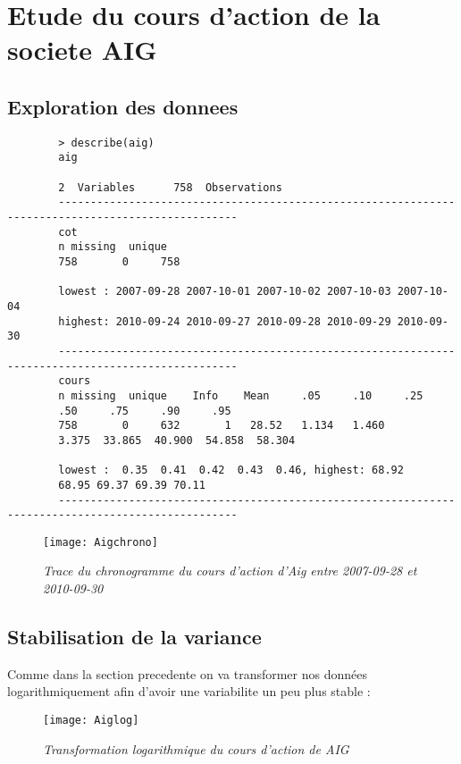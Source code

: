 \section{Etude du cours d'action de la societe AIG}
    \subsection{Exploration des donnees}
        \begin{verbatim}
        > describe(aig)
        aig 

        2  Variables      758  Observations
        --------------------------------------------------------------------------------------------------
        cot 
        n missing  unique 
        758       0     758 

        lowest : 2007-09-28 2007-10-01 2007-10-02 2007-10-03 2007-10-04
        highest: 2010-09-24 2010-09-27 2010-09-28 2010-09-29 2010-09-30 
        --------------------------------------------------------------------------------------------------
        cours 
        n missing  unique    Info    Mean     .05     .10     .25
        .50     .75     .90     .95 
        758       0     632       1   28.52   1.134   1.460
        3.375  33.865  40.900  54.858  58.304 

        lowest :  0.35  0.41  0.42  0.43  0.46, highest: 68.92
        68.95 69.37 69.39 70.11 
        --------------------------------------------------------------------------------------------------
        \end{verbatim}
        \begin{figure}[H]
            \centering 
            \label{fig:Aigchrono} 
            \texttt{[image: Aigchrono]} 
            \caption{\it Trace du chronogramme du cours d'action d'Aig entre
            2007-09-28 et 2010-09-30} 
        \end{figure} 

    \subsection{Stabilisation de la variance}                

        Comme dans la section precedente on va transformer nos données
        logarithmiquement afin d'avoir une variabilite un peu plus
        stable :
        \begin{figure}[H]
            \centering 
            \label{fig:Aiglog} 
            \texttt{[image: Aiglog]} 
            \caption{\it Transformation logarithmique du cours
            d'action de AIG } 
        \end{figure} 

